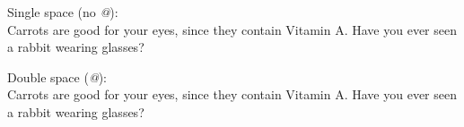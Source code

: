 \documentclass{article}
\begin{document}
\noindent Single space (no \emph{@}):\\
\noindent Carrots are good for your eyes, since they contain Vitamin A. Have you ever seen a rabbit wearing glasses?

\noindent Double space (\emph{@}):\\
\noindent Carrots are good for your eyes, since they contain Vitamin A\@. Have you ever seen a rabbit wearing glasses?
\end{document}
